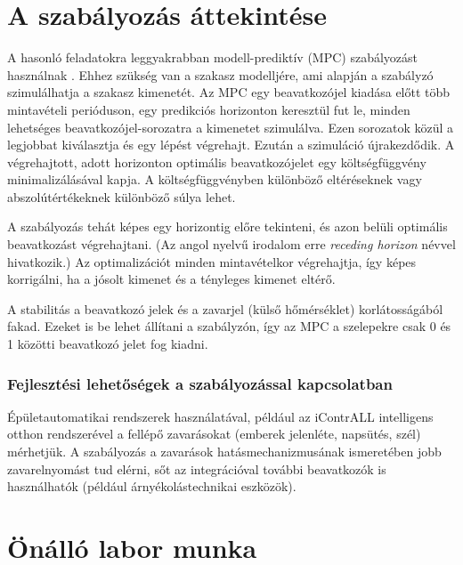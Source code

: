 \chapter{A szabályozás áttekintése}\label{chap:control}

A hasonló feladatokra leggyakrabban modell-prediktív (MPC) szabályozást használnak \cite{AFRAM2014343}. Ehhez szükség van a szakasz modelljére, ami alapján a szabályzó szimulálhatja a szakasz kimenetét. Az MPC egy beavatkozójel kiadása előtt több mintavételi perióduson, egy predikciós horizonton keresztül fut le, minden lehetséges  beavatkozójel-sorozatra a kimenetet szimulálva.
Ezen sorozatok közül a legjobbat kiválasztja és egy lépést végrehajt. Ezután a szimuláció újrakezdődik. A végrehajtott, adott horizonton optimális beavatkozójelet egy költségfüggvény minimalizálásával kapja. A költségfüggvényben különböző eltéréseknek vagy abszolútértékeknek különböző súlya lehet.

A szabályozás tehát képes egy horizontig előre tekinteni, és azon belüli optimális beavatkozást végrehajtani. (Az angol nyelvű irodalom erre \textit{receding horizon} névvel hivatkozik.) Az optimalizációt minden mintavételkor végrehajtja, így képes korrigálni, ha a jósolt kimenet és a tényleges kimenet eltérő.

A stabilitás a beavatkozó jelek és a zavarjel (külső hőmérséklet) korlátosságából fakad. Ezeket is be lehet állítani a szabályzón, így az MPC a szelepekre csak 0 és 1 közötti beavatkozó jelet fog kiadni.

\vspace{6pt}



\subsection{Fejlesztési lehetőségek a szabályozással kapcsolatban}
	
Épületautomatikai rendszerek használatával, például az iContrALL intelligens otthon rendszerével a fellépő zavarásokat (emberek jelenléte, napsütés, szél) mérhetjük. A szabályozás a zavarások hatásmechanizmusának ismeretében jobb zavarelnyomást tud elérni, sőt az integrációval további beavatkozók is használhatók (például árnyékolástechnikai eszközök).

\pagebreak

\chapter{Önálló labor munka}




